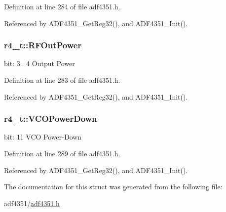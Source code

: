 Definition at line 284 of file adf4351.\+h.



Referenced by A\+D\+F4351\+\_\+\+Get\+Reg32(), and A\+D\+F4351\+\_\+\+Init().

\subsubsection[{\texorpdfstring{R\+F\+Out\+Power}{RFOutPower}}]{ r4\+\_\+t\+::\+R\+F\+Out\+Power}\hypertarget{structr4__t_ade4ee7f86064dd89515558dc5aa138bd}{}\label{structr4__t_ade4ee7f86064dd89515558dc5aa138bd}
bit\+: 3.. 4 Output Power 

Definition at line 283 of file adf4351.\+h.



Referenced by A\+D\+F4351\+\_\+\+Get\+Reg32(), and A\+D\+F4351\+\_\+\+Init().

\subsubsection[{\texorpdfstring{V\+C\+O\+Power\+Down}{VCOPowerDown}}]{ r4\+\_\+t\+::\+V\+C\+O\+Power\+Down}\hypertarget{structr4__t_a144b348686f74ef9a401f2c57f324824}{}\label{structr4__t_a144b348686f74ef9a401f2c57f324824}
bit\+: 11 V\+CO Power-\/\+Down 

Definition at line 289 of file adf4351.\+h.



Referenced by A\+D\+F4351\+\_\+\+Get\+Reg32(), and A\+D\+F4351\+\_\+\+Init().



The documentation for this struct was generated from the following file\+:\begin{DoxyCompactItemize}
\item 
adf4351/\hyperlink{adf4351_8h}{adf4351.\+h}\end{DoxyCompactItemize}
